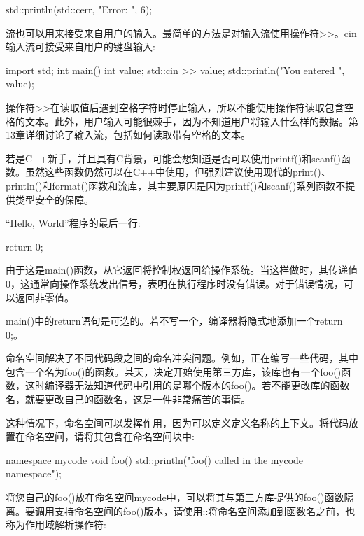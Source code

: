 \begin{cpp}
std::println(std::cerr, "Error: {}", 6);
\end{cpp}

流也可以用来接受来自用户的输入。最简单的方法是对输入流使用操作符>{}>。cin输入流可接受来自用户的键盘输入:

\begin{cpp}
import std;
int main()
{
    int value;
    std::cin >> value;
    std::println("You entered {}", value);
}
\end{cpp}

操作符>{}>在读取值后遇到空格字符时停止输入，所以不能使用操作符读取包含空格的文本。此外，用户输入可能很棘手，因为不知道用户将输入什么样的数据。第13章详细讨论了输入流，包括如何读取带有空格的文本。

若是C++新手，并且具有C背景，可能会想知道是否可以使用printf()和scanf()函数。虽然这些函数仍然可以在C++中使用，但强烈建议使用现代的print()、println()和format()函数和流库，其主要原因是因为printf()和scanf()系列函数不提供类型安全的保障。


“Hello, World”程序的最后一行:

\begin{cpp}
return 0;
\end{cpp}

由于这是main()函数，从它返回将控制权返回给操作系统。当这样做时，其传递值0，这通常向操作系统发出信号，表明在执行程序时没有错误。对于错误情况，可以返回非零值。

main()中的return语句是可选的。若不写一个，编译器将隐式地添加一个return 0;。


命名空间解决了不同代码段之间的命名冲突问题。例如，正在编写一些代码，其中包含一个名为foo()的函数。某天，决定开始使用第三方库，该库也有一个foo()函数，这时编译器无法知道代码中引用的是哪个版本的foo()。若不能更改库的函数名，就要更改自己的函数名，这是一件非常痛苦的事情。

这种情况下，命名空间可以发挥作用，因为可以定义定义名称的上下文。将代码放置在命名空间，请将其包含在命名空间块中:

\begin{cpp}
namespace mycode {
    void foo()
    {
        std::println("foo() called in the mycode namespace");
    }
}
\end{cpp}

将您自己的foo()放在命名空间mycode中，可以将其与第三方库提供的foo()函数隔离。要调用支持命名空间的foo()版本，请使用::将命名空间添加到函数名之前，也称为作用域解析操作符:

